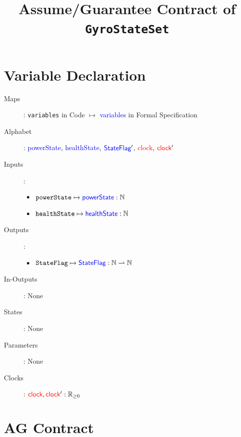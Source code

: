\documentclass[fleqn,a4paper]{article}
\newcommand\var[1]{\texttt{#1}}
\newcommand\Var[1]{\textcolor{blue}{\textsf{#1}}}
\newcommand\clock{\textcolor{red}{\textsf{clock}}}
\begin{document}
\title{Assume/Guarantee Contract of \texttt{GyroStateSet}}
\author{}

\maketitle

\section{Variable Declaration}

\begin{description}
\item[Maps]:
\var{variables} in Code $\mapsto$ \Var{variables} in Formal Specification

\item[Alphabet]:
\Var{powerState},
\Var{healthState},
$\Var{StateFlag}'$,
\clock,
$\clock'$

\item[Inputs]:
\begin{itemize}
\item $\var{powerState} \mapsto \Var{powerState} : \mathbb{N}$
\item $\var{healthState} \mapsto \Var{healthState} : \mathbb{N}$
\end{itemize}

\item[Outputs]:
\begin{itemize}
\item $\var{StateFlag} \mapsto \Var{StateFlag} : \mathbb{N}\rightharpoonup\mathbb{N}$
\end{itemize}

\item[In-Outputs]: None

\item[States]: None

\item[Parameters]: None

\item[Clocks]:
$\clock, \clock' : \mathbb{R}_{\geq 0}$

\end{description}

\section{AG Contract}
\end{document}
